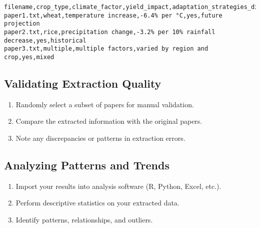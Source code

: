 \begin{commandbox}
\begin{lstlisting}
filename,crop_type,climate_factor,yield_impact,adaptation_strategies_discussed,study_timeframe
paper1.txt,wheat,temperature increase,-6.4% per °C,yes,future projection
paper2.txt,rice,precipitation change,-3.2% per 10% rainfall decrease,yes,historical
paper3.txt,multiple,multiple factors,varied by region and crop,yes,mixed
\end{lstlisting}
\end{commandbox}


\subsection{Validating Extraction Quality}

\begin{enumerate}
    \item Randomly select a subset of papers for manual validation.
    \item Compare the extracted information with the original papers.

    \item Note any discrepancies or patterns in extraction errors.
\end{enumerate}

\subsection{Analyzing Patterns and Trends}

\begin{enumerate}
    \item Import your results into analysis software (R, Python, Excel, etc.).
    \item Perform descriptive statistics on your extracted data.
    \item Identify patterns, relationships, and outliers.
\end{enumerate}

